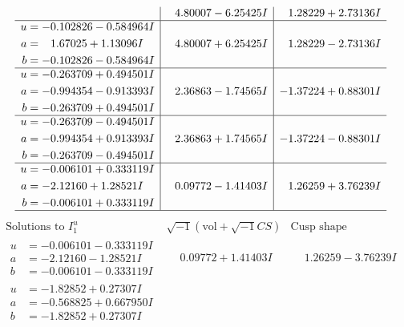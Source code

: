 \documentclass[1p]{elsarticle_modified}
\theoremstyle{definition}
\newcommand{\I}{\sqrt{-1}}
\begin{document}
$$\begin{array}{c|c|c}
 & \phantom{-}4.80007 - 6.25425 I & \phantom{-}1.28229 + 2.73136 I \\ \hline\begin{aligned}
u &= -0.102826 - 0.584964 I \\
a &= \phantom{-}1.67025 + 1.13096 I \\
b &= -0.102826 - 0.584964 I\end{aligned}
 & \phantom{-}4.80007 + 6.25425 I & \phantom{-}1.28229 - 2.73136 I \\ \hline\begin{aligned}
u &= -0.263709 + 0.494501 I \\
a &= -0.994354 - 0.913393 I \\
b &= -0.263709 + 0.494501 I\end{aligned}
 & \phantom{-}2.36863 - 1.74565 I & -1.37224 + 0.88301 I \\ \hline\begin{aligned}
u &= -0.263709 - 0.494501 I \\
a &= -0.994354 + 0.913393 I \\
b &= -0.263709 - 0.494501 I\end{aligned}
 & \phantom{-}2.36863 + 1.74565 I & -1.37224 - 0.88301 I \\ \hline\begin{aligned}
u &= -0.006101 + 0.333119 I \\
a &= -2.12160 + 1.28521 I \\
b &= -0.006101 + 0.333119 I\end{aligned}
 & \phantom{-}0.09772 - 1.41403 I & \phantom{-}1.26259 + 3.76239 I\\
 \hline 
 \end{array}$$\newpage$$\begin{array}{c|c|c}  
\text{Solutions to }I^u_{1}& \I (\text{vol} + \sqrt{-1}CS) & \text{Cusp shape}\\
 \hline 
\begin{aligned}
u &= -0.006101 - 0.333119 I \\
a &= -2.12160 - 1.28521 I \\
b &= -0.006101 - 0.333119 I\end{aligned}
 & \phantom{-}0.09772 + 1.41403 I & \phantom{-}1.26259 - 3.76239 I \\ \hline\begin{aligned}
u &= -1.82852 + 0.27307 I \\
a &= -0.568825 + 0.667950 I \\
b &= -1.82852 + 0.27307 I\end{aligned}

\end{array}$$
\end{document}
